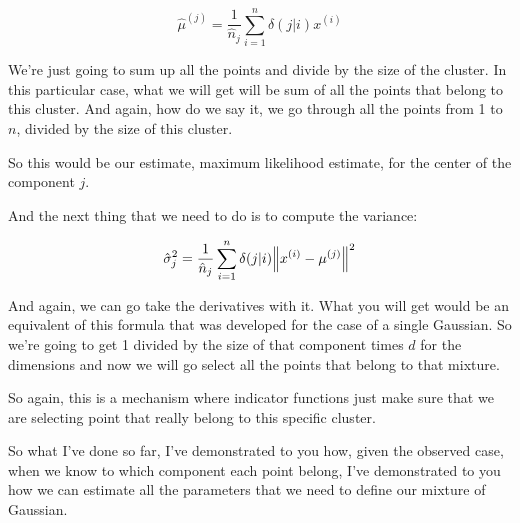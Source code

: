 \documentclass[a4paper, 12pt]{article}
\begin{document}
\begin{equation}
\label{eq:org5458362}
\hat{\mu}^{(j)} = \frac{1}{\hat{n}_j} \sum_{i=1}^{n} \delta(j|i) x^{(i)}
\end{equation}

We're just going to sum up all the points and divide by the size of the cluster.
In this particular case, what we will get will be sum of all the points that
belong to this cluster. And again, how do we say it, we go through all the
points from 1 to \(n\), divided by the size of this cluster.

So this would be our estimate, maximum likelihood estimate, for the center of
the component \(j\). 

And the next thing that we need to do is to compute the
variance:

\begin{equation}
\label{eq:orgca734fd}
\hat{\sigma}_{j}^{2} = \frac{1}{\hat{n}_j} \sum_{i=1}^{n} \delta(j|i) \norm{x^{(i)} - \mu^{(j)}}^2
\end{equation}

And again, we can go take the derivatives with it. What you will get would be an
equivalent of this formula that was developed for the case of a single Gaussian.
So we're going to get 1 divided by the size of that component times \(d\) for
the dimensions and now we will go select all the points that belong to that
mixture.

So again, this is a mechanism where indicator functions just make sure that we
are selecting point that really belong to this specific cluster.

So what I've done so far, I've demonstrated to you how, given the observed case,
when we know to which component each point belong, I've demonstrated to you how
we can estimate all the parameters that we need to define our mixture of
Gaussian.
\end{document}
